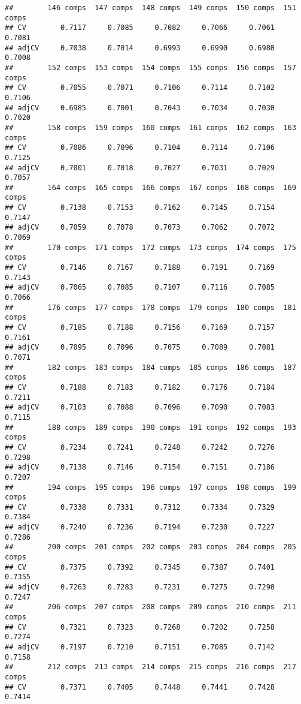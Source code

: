 \documentclass[
]{article}
\begin{document}
\begin{verbatim}
##        146 comps  147 comps  148 comps  149 comps  150 comps  151 comps
## CV        0.7117     0.7085     0.7082     0.7066     0.7061     0.7081
## adjCV     0.7038     0.7014     0.6993     0.6990     0.6980     0.7008
##        152 comps  153 comps  154 comps  155 comps  156 comps  157 comps
## CV        0.7055     0.7071     0.7106     0.7114     0.7102     0.7106
## adjCV     0.6985     0.7001     0.7043     0.7034     0.7030     0.7020
##        158 comps  159 comps  160 comps  161 comps  162 comps  163 comps
## CV        0.7086     0.7096     0.7104     0.7114     0.7106     0.7125
## adjCV     0.7001     0.7018     0.7027     0.7031     0.7029     0.7057
##        164 comps  165 comps  166 comps  167 comps  168 comps  169 comps
## CV        0.7138     0.7153     0.7162     0.7145     0.7154     0.7147
## adjCV     0.7059     0.7078     0.7073     0.7062     0.7072     0.7069
##        170 comps  171 comps  172 comps  173 comps  174 comps  175 comps
## CV        0.7146     0.7167     0.7188     0.7191     0.7169     0.7143
## adjCV     0.7065     0.7085     0.7107     0.7116     0.7085     0.7066
##        176 comps  177 comps  178 comps  179 comps  180 comps  181 comps
## CV        0.7185     0.7188     0.7156     0.7169     0.7157     0.7161
## adjCV     0.7095     0.7096     0.7075     0.7089     0.7081     0.7071
##        182 comps  183 comps  184 comps  185 comps  186 comps  187 comps
## CV        0.7188     0.7183     0.7182     0.7176     0.7184     0.7211
## adjCV     0.7103     0.7088     0.7096     0.7090     0.7083     0.7115
##        188 comps  189 comps  190 comps  191 comps  192 comps  193 comps
## CV        0.7234     0.7241     0.7248     0.7242     0.7276     0.7298
## adjCV     0.7138     0.7146     0.7154     0.7151     0.7186     0.7207
##        194 comps  195 comps  196 comps  197 comps  198 comps  199 comps
## CV        0.7338     0.7331     0.7312     0.7334     0.7329     0.7384
## adjCV     0.7240     0.7236     0.7194     0.7230     0.7227     0.7286
##        200 comps  201 comps  202 comps  203 comps  204 comps  205 comps
## CV        0.7375     0.7392     0.7345     0.7387     0.7401     0.7355
## adjCV     0.7263     0.7283     0.7231     0.7275     0.7290     0.7247
##        206 comps  207 comps  208 comps  209 comps  210 comps  211 comps
## CV        0.7321     0.7323     0.7268     0.7202     0.7258     0.7274
## adjCV     0.7197     0.7210     0.7151     0.7085     0.7142     0.7158
##        212 comps  213 comps  214 comps  215 comps  216 comps  217 comps
## CV        0.7371     0.7405     0.7448     0.7441     0.7428     0.7414

\end{verbatim}
\end{document}
